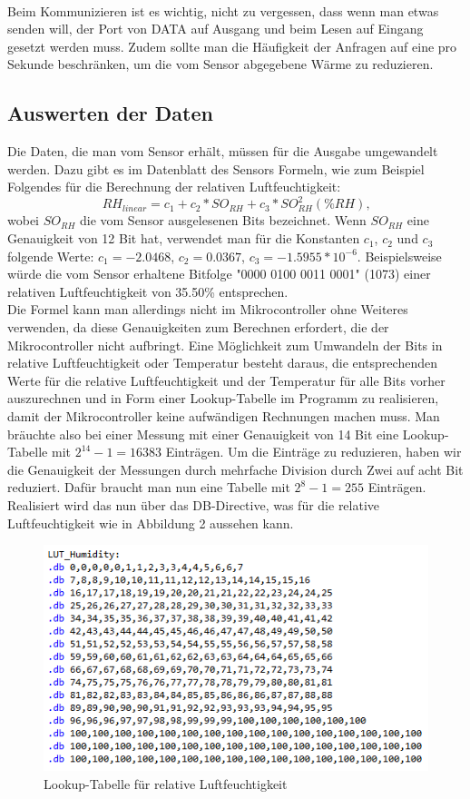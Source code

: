 \documentclass[]{article}
\begin{document}
\\Beim Kommunizieren ist es wichtig, nicht zu vergessen, dass wenn man etwas senden will, der Port von DATA auf Ausgang und beim Lesen auf Eingang gesetzt werden muss. Zudem sollte man die Häufigkeit der Anfragen auf eine pro Sekunde beschränken, um die vom Sensor abgegebene Wärme zu reduzieren.

\subsection{Auswerten der Daten}
Die Daten, die man vom Sensor erhält, müssen für die Ausgabe umgewandelt werden. Dazu gibt es im Datenblatt des Sensors Formeln, wie zum Beispiel Folgendes für die Berechnung der relativen Luftfeuchtigkeit:
\begin{equation*}
RH_{linear} = c_1 + c_2*SO_{RH} + c_3*SO_{RH}^{2} \left(\%RH\right)\textbf{,}
\end{equation*}
wobei $SO_{RH}$ die vom Sensor ausgelesenen Bits bezeichnet. Wenn $SO_{RH}$ eine Genauigkeit von 12 Bit hat, verwendet man für die Konstanten $c_1$, $c_2$ und $c_3$ folgende Werte: $c_1 = -2.0468$, $c_2 = 0.0367$, $c_3 = -1.5955*10^{-6}$.
Beispielsweise würde die vom Sensor erhaltene Bitfolge "0000 0100 0011 0001" (1073) einer relativen Luftfeuchtigkeit von 35.50\% entsprechen.\\
Die Formel kann man allerdings nicht im Mikrocontroller ohne Weiteres verwenden, da diese Genauigkeiten zum Berechnen erfordert, die der Mikrocontroller nicht aufbringt. Eine Möglichkeit zum Umwandeln der Bits in relative Luftfeuchtigkeit oder Temperatur besteht daraus, die entsprechenden Werte für die relative Luftfeuchtigkeit und der Temperatur für alle Bits vorher auszurechnen und in Form einer Lookup-Tabelle im Programm zu realisieren, damit der Mikrocontroller keine aufwändigen Rechnungen machen muss. Man bräuchte also bei einer Messung mit einer Genauigkeit von 14 Bit eine Lookup-Tabelle mit $2^{14}-1 = 16383$ Einträgen. Um die Einträge zu reduzieren, haben wir die Genauigkeit der Messungen durch mehrfache Division durch Zwei auf acht Bit reduziert. Dafür braucht man nun eine Tabelle mit $2^8-1 = 255$ Einträgen. Realisiert wird das nun über das DB-Directive, was für die relative Luftfeuchtigkeit wie in Abbildung 2 aussehen kann.
\begin{figure}[h]
	\centering
	\includegraphics[width=0.7\columnwidth]{LUT.png}
	\caption{Lookup-Tabelle für relative Luftfeuchtigkeit}
\end{figure}
\end{document}
